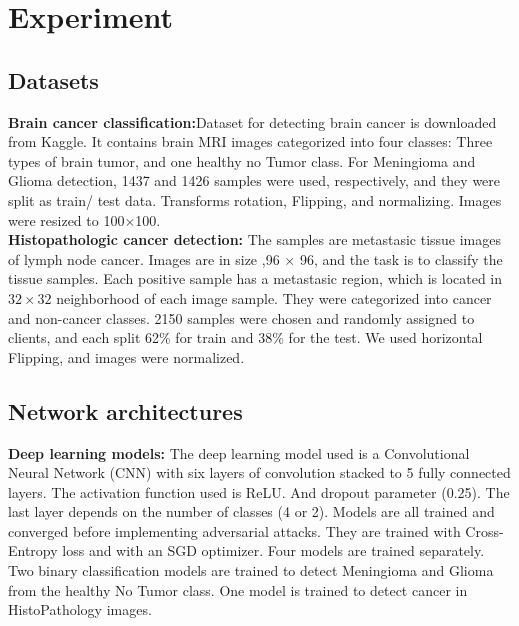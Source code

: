 

\section{Experiment}




\subsection{Datasets}

\textbf{Brain cancer classification:}Dataset for detecting brain cancer is downloaded from Kaggle. It contains brain MRI images categorized into four classes: Three types of brain tumor,  and one healthy no Tumor class. 
For Meningioma and Glioma detection, 1437 and 1426 samples were used, respectively,  and they were split as train/ test data. Transforms rotation, Flipping, and normalizing.  Images were resized to 100$\times$100. 
\\
\textbf{Histopathologic cancer detection:} 
The samples are metastasic tissue images of lymph node cancer. Images are in size ,96 $\times$ 96, and the task is to classify the tissue samples. Each positive sample has a metastasic region, which is located in $32\times32$ neighborhood of each image sample. 
They were categorized into cancer and non-cancer classes. 2150 samples were chosen and randomly assigned to clients, and each split 62\% for train and 38\% for the test. We used horizontal Flipping, and images were normalized.

\subsection{Network architectures}

\textbf{Deep learning models:}
The deep learning model used is a Convolutional Neural Network (CNN) with six layers of convolution stacked to 5 fully connected layers. The activation function used is ReLU. And dropout parameter (0.25). The last layer depends on the number of classes (4 or 2). Models are all trained and converged before implementing adversarial attacks.
They are trained with Cross-Entropy loss and with an SGD optimizer. Four models are trained separately. Two binary classification models are trained to detect Meningioma and Glioma from the healthy No Tumor class. One model is trained to detect cancer in HistoPathology images.

